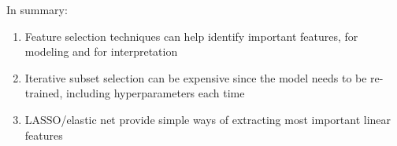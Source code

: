 In summary:
\vspace{1cm}
\pause{}
\begin{enumerate}
	\item Feature selection techniques can help identify important features, for modeling and for interpretation
	\item Iterative subset selection can be expensive since the model needs to be re-trained, including hyperparameters each time
	\item LASSO/elastic net provide simple ways of extracting most important linear features
\end{enumerate}
